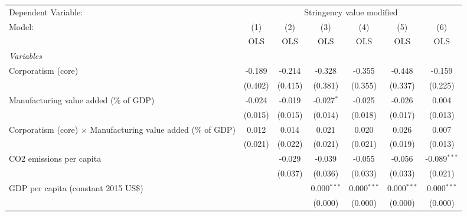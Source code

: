 
\begingroup
\centering
\begin{tabular}{lcccccc}
   \toprule
   Dependent Variable: & \multicolumn{6}{c}{Stringency value modified}\\
   Model:                                                              & (1)     & (2)     & (3)           & (4)           & (5)           & (6)\\  
                                                                       &  OLS    & OLS     & OLS           & OLS           & OLS           & OLS\\  
   \midrule
   \emph{Variables}\\
   Corporatism (core)                                                  & -0.189  & -0.214  & -0.328        & -0.355        & -0.448        & -0.159\\   
                                                                       & (0.402) & (0.415) & (0.381)       & (0.355)       & (0.337)       & (0.225)\\   
   Manufacturing value added (\% of GDP)                               & -0.024  & -0.019  & -0.027$^{*}$  & -0.025        & -0.026        & 0.004\\   
                                                                       & (0.015) & (0.015) & (0.014)       & (0.018)       & (0.017)       & (0.013)\\   
   Corporatism (core) $\times$ Manufacturing value added (\% of GDP)   & 0.012   & 0.014   & 0.021         & 0.020         & 0.026         & 0.007\\   
                                                                       & (0.021) & (0.022) & (0.021)       & (0.021)       & (0.019)       & (0.013)\\   
   CO2 emissions per capita                                            &         & -0.029  & -0.039        & -0.055        & -0.056        & -0.089$^{***}$\\   
                                                                       &         & (0.037) & (0.036)       & (0.033)       & (0.033)       & (0.021)\\   
   GDP per capita (constant 2015 US\$)                                 &         &         & 0.000$^{***}$ & 0.000$^{***}$ & 0.000$^{***}$ & 0.000$^{***}$\\   
                                                                       &         &         & (0.000)       & (0.000)       & (0.000)       & (0.000)\\   

\end{tabular}
